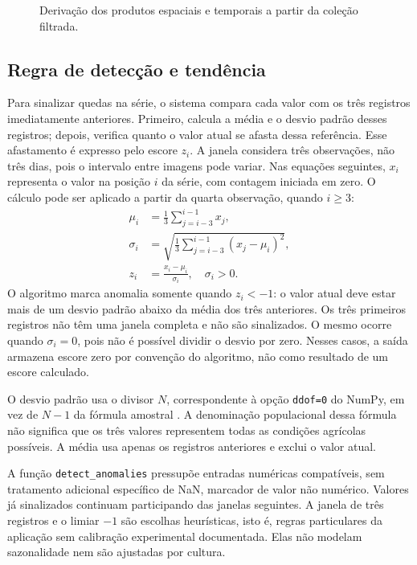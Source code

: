 \begin{figure}[htbp]
\centering
\resizebox{0.96\textwidth}{!}{}
\caption{Derivação dos produtos espaciais e temporais a partir da coleção filtrada.}
\label{fig:fluxo-analise}
\end{figure}

\subsection{Regra de detecção e tendência}\label{sec:anomalias-final}

Para sinalizar quedas na série, o sistema compara cada valor com os três registros imediatamente anteriores. Primeiro, calcula a média e o desvio padrão desses registros; depois, verifica quanto o valor atual se afasta dessa referência. Esse afastamento é expresso pelo escore $z_i$. A janela considera três observações, não três dias, pois o intervalo entre imagens pode variar. Nas equações seguintes, $x_i$ representa o valor na posição $i$ da série, com contagem iniciada em zero. O cálculo pode ser aplicado a partir da quarta observação, quando $i\geq3$:
\begin{align}
 \mu_i&=\frac{1}{3}\sum_{j=i-3}^{i-1}x_j,\\
 \sigma_i&=\sqrt{\frac{1}{3}\sum_{j=i-3}^{i-1}(x_j-\mu_i)^2},\\
 z_i&=\frac{x_i-\mu_i}{\sigma_i},\quad \sigma_i>0.\label{eq:escore-final}
\end{align}
O algoritmo marca anomalia somente quando $z_i<-1$: o valor atual deve estar mais de um desvio padrão abaixo da média dos três anteriores. Os três primeiros registros não têm uma janela completa e não são sinalizados. O mesmo ocorre quando $\sigma_i=0$, pois não é possível dividir o desvio por zero. Nesses casos, a saída armazena escore zero por convenção do algoritmo, não como resultado de um escore calculado.

O desvio padrão usa o divisor $N$, correspondente à opção \texttt{ddof=0} do NumPy, em vez de $N-1$ da fórmula amostral \citep{NUMPY_STD}. A denominação populacional dessa fórmula não significa que os três valores representem todas as condições agrícolas possíveis. A média usa apenas os registros anteriores e exclui o valor atual.

A função \texttt{detect\_anomalies} pressupõe entradas numéricas compatíveis, sem tratamento adicional específico de NaN, marcador de valor não numérico. Valores já sinalizados continuam participando das janelas seguintes. A janela de três registros e o limiar $-1$ são escolhas heurísticas, isto é, regras particulares da aplicação sem calibração experimental documentada. Elas não modelam sazonalidade nem são ajustadas por cultura.

